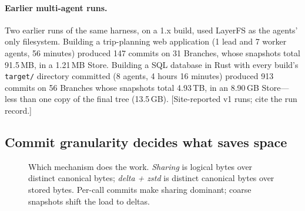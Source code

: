 \documentclass[letterpaper,twocolumn,10pt]{article}
\newif\ifdraft\drafttrue
\newcommand{\dnote}[1]{\ifdraft\textcolor{red!70!black}{\textsf{\small[#1]}}\fi}
\newcommand{\sys}{LayerFS}
\newcommand{\X}{$\times$}
\begin{document}
\paragraph{Earlier multi-agent runs.} Two earlier runs of the same harness,
on a 1.x build, used \sys{} as the agents' only filesystem. Building a
trip-planning web application (1 lead and 7 worker agents, 56 minutes)
produced 147 commits on 31 Branches, whose snapshots total 91.5\,MB, in a
1.21\,MB Store. Building a SQL database in Rust with every build's
\texttt{target/} directory committed (8 agents, 4 hours 16 minutes)
produced 913 commits on 56 Branches whose snapshots total 4.93\,TB, in an
8.90\,GB Store---less than one copy of the final tree (13.5\,GB).
\dnote{Site-reported v1 runs; cite the run record.}

\subsection{Commit granularity decides what saves space}
\label{sec:eval-granularity}

\begin{figure}[t]
\centering
{}
\caption{Which mechanism does the work. \emph{Sharing} is logical bytes
over distinct canonical bytes; \emph{delta + zstd} is distinct canonical
bytes over stored bytes. Per-call commits make sharing dominant; coarse snapshots
shift the load to deltas.}
\label{fig:granularity}
\end{figure}
\end{document}
